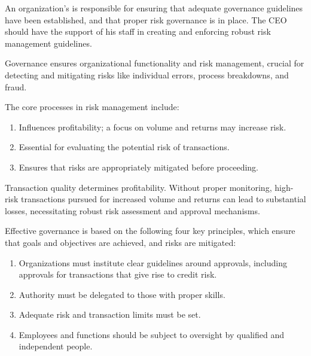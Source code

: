 An organization's  is responsible for
ensuring that adequate governance guidelines have been established, and that
proper risk governance is in place. The CEO should have the support of his staff
in creating and enforcing robust risk management guidelines.


Governance ensures organizational functionality and risk management, crucial for
detecting and mitigating risks like individual errors, process breakdowns, and
fraud.

The core processes in risk management include:

\begin{enumerate}
\item {} Influences profitability; a focus on volume and
returns may increase risk.
\item {} Essential for evaluating the potential risk
of transactions.
\item {} Ensures that risks are appropriately mitigated
before proceeding.
\end{enumerate}

Transaction quality determines profitability. Without proper monitoring,
high-risk transactions pursued for increased volume and returns can lead to
substantial losses, necessitating robust risk assessment and approval
mechanisms.


Effective governance is based on the following four key principles, which ensure
that goals and objectives are achieved, and risks are mitigated:

\begin{enumerate}
\item {} Organizations must institute clear guidelines around
approvals, including approvals for transactions that give rise to credit risk.
\item {} Authority must be delegated to those with proper skills.
\item {} Adequate risk and transaction limits must be set.
\item {} Employees and functions should be subject to oversight by
qualified and independent people.
\end{enumerate}

